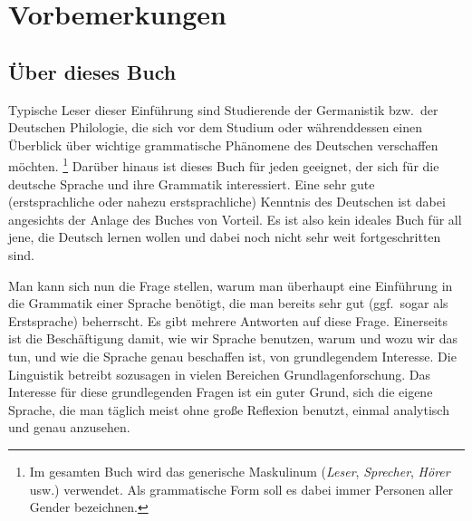\Phantom
{}

\chapter*{Vorbemerkungen}

\section*{Über dieses Buch}

Typische Leser dieser Einführung sind Studierende der Germanistik bzw.\ der Deutschen Philologie, die sich vor dem Studium oder währenddessen einen Überblick über wichtige grammatische Phänomene des Deutschen verschaffen möchten.%
\footnote{Im gesamten Buch wird das generische Maskulinum (\textit{Leser}, \textit{Sprecher}, \textit{Hörer} usw.) verwendet.
Als grammatische Form soll es dabei immer Personen aller Gender bezeichnen.}
Darüber hinaus ist dieses Buch für jeden geeignet, der sich für die deutsche Sprache und ihre Grammatik interessiert.
Eine sehr gute (erstsprachliche oder nahezu erstsprachliche) Kenntnis des Deutschen ist dabei angesichts der Anlage des Buches von Vorteil.
Es ist also kein ideales Buch für all jene, die Deutsch lernen wollen und dabei noch nicht sehr weit fortgeschritten sind.

Man kann sich nun die Frage stellen, warum man überhaupt eine Einführung in die Grammatik einer Sprache benötigt, die man bereits sehr gut (ggf.\ sogar als Erstsprache) beherrscht.
Es gibt mehrere Antworten auf diese Frage.
Einerseits ist die Beschäftigung damit, wie wir Sprache benutzen, warum und wozu wir das tun, und wie die Sprache genau beschaffen ist, von grundlegendem Interesse.
Die Linguistik betreibt sozusagen in vielen Bereichen Grundlagenforschung.
Das Interesse für diese grundlegenden Fragen ist ein guter Grund, sich die eigene Sprache, die man täglich meist ohne große Reflexion benutzt, einmal analytisch und genau anzusehen.

